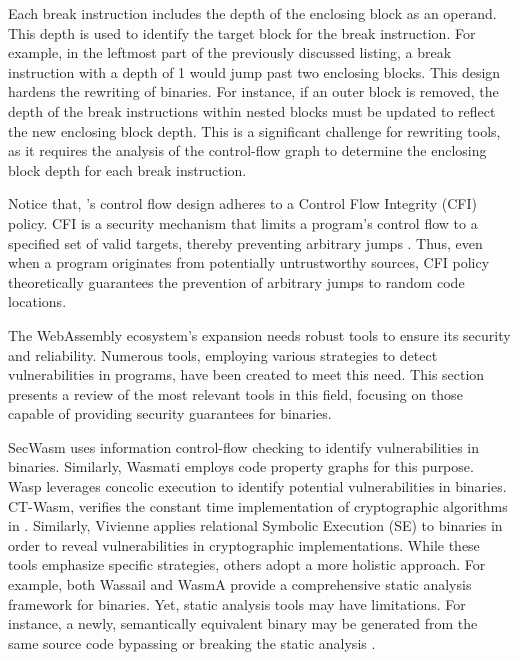 

Each break instruction includes the depth of the enclosing block as an operand. 
This depth is used to identify the target block for the break instruction. 
For example, in the leftmost part of the previously discussed listing, a break instruction with a depth of 1 would jump past two enclosing blocks.
This design hardens the rewriting of \Wasm binaries.
For instance, if an outer block is removed, the depth of the break instructions within nested blocks must be updated to reflect the new enclosing block depth.
This is a significant challenge for rewriting tools, as it requires the analysis of the control-flow graph to determine the enclosing block depth for each break instruction.

Notice that, \Wasm's control flow design adheres to a Control Flow Integrity (CFI) policy. 
CFI is a security mechanism that limits a program's control flow to a specified set of valid targets, thereby preventing arbitrary jumps \cite{cfi}.
Thus, even when a \Wasm program originates from potentially untrustworthy sources, CFI policy theoretically guarantees the prevention of arbitrary jumps to random code locations.


\label{background:wasm:analysis}

The WebAssembly ecosystem's expansion needs robust tools to ensure its security and reliability. 
Numerous tools, employing various strategies to detect vulnerabilities in \Wasm programs, have been created to meet this need. 
This section presents a review of the most relevant tools in this field, focusing on those capable of providing security guarantees for \Wasm binaries.

 SecWasm\cite{secwasm} uses information control-flow checking to identify vulnerabilities in \Wasm binaries. 
Similarly, Wasmati\cite{wasmati} employs code property graphs for this purpose. 
Wasp\cite{Wasp} leverages concolic execution to identify potential vulnerabilities in \Wasm binaries. 
CT-Wasm\cite{ctwasm}, verifies the constant time implementation of cryptographic algorithms in \Wasm. 
Similarly, Vivienne applies relational Symbolic Execution (SE) to \Wasm binaries in order to reveal vulnerabilities in cryptographic implementations\cite{Vivienne}. 
While these tools emphasize specific strategies, others adopt a more holistic approach. 
For example, both Wassail\cite{wassail} and WasmA\cite{WasmA} provide a comprehensive static analysis framework for \Wasm binaries. 
Yet, static analysis tools may have limitations. 
For instance, a newly, semantically equivalent \Wasm binary may be generated from the same source code bypassing or breaking the static analysis \cite{wasmixer}.

